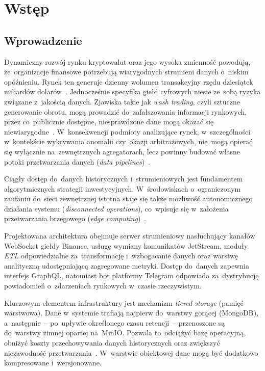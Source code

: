 \chapter{Wstęp}

\label{ch:wstep}


\section{Wprowadzenie}

Dynamiczny rozwój rynku kryptowalut oraz jego wysoka zmienność powodują, że~organizacje finansowe potrzebują wiarygodnych strumieni danych o~niskim opóźnieniu.
Rynek ten generuje dzienny wolumen transakcyjny rzędu dziesiątek miliardów dolarów~\cite{coingecko}.
Jednocześnie specyfika giełd cyfrowych niesie ze~sobą ryzyka związane z~jakością danych.
Zjawiska takie jak \textit{wash trading}, czyli sztuczne generowanie obrotu, mogą prowadzić do~zafałszowania informacji rynkowych, przez co~publicznie dostępne, niesprawdzone dane mogą okazać się niewiarygodne~\cite{wash_trading}.
W~konsekwencji podmioty analizujące rynek, w~szczególności w~kontekście wykrywania anomalii czy~okazji arbitrażowych, nie~mogą opierać się wyłącznie na~zewnętrznych agregatorach, lecz powinny budować własne potoki przetwarzania danych (\textit{data pipelines})~\cite{arbitrage_finance}.

Ciągły dostęp do~danych historycznych i~strumieniowych jest fundamentem algorytmicznych strategii inwestycyjnych.
W~środowiskach o~ograniczonym zaufaniu do~sieci zewnętrznej istotna staje się także możliwość autonomicznego działania systemu (\textit{disconnected operations}), co~wpisuje się w~założenia przetwarzania brzegowego (\textit{edge computing})~\cite{edge_computing_satya}.

Projektowana architektura obejmuje serwer strumieniowy nasłuchujący kanałów WebSocket giełdy Binance, usługę wymiany komunikatów JetStream, moduły \textit{ETL} odpowiedzialne za~transformację i~wzbogacanie danych oraz warstwę analityczną udostępniającą zagregowane metryki.
Dostęp do~danych zapewnia interfejs GraphQL, natomiast bot platformy Telegram odpowiada za~dystrybucję powiadomień o~zdarzeniach rynkowych w~czasie rzeczywistym.

Kluczowym elementem infrastruktury jest mechanizm \textit{tiered storage} (pamięć warstwowa).
Dane w~systemie trafiają najpierw do~warstwy gorącej (MongoDB), a~następnie~-- po~upływie określonego czasu retencji~-- przenoszone są do~warstwy zimnej opartej na~MinIO. Pozwala to~odciążyć bazę operacyjną, obniżyć koszty przechowywania danych historycznych oraz zwiększyć niezawodność przetwarzania~\cite{unity_tiered_storage}.
W~warstwie obiektowej dane mogą być dodatkowo kompresowane i~wersjonowane.


